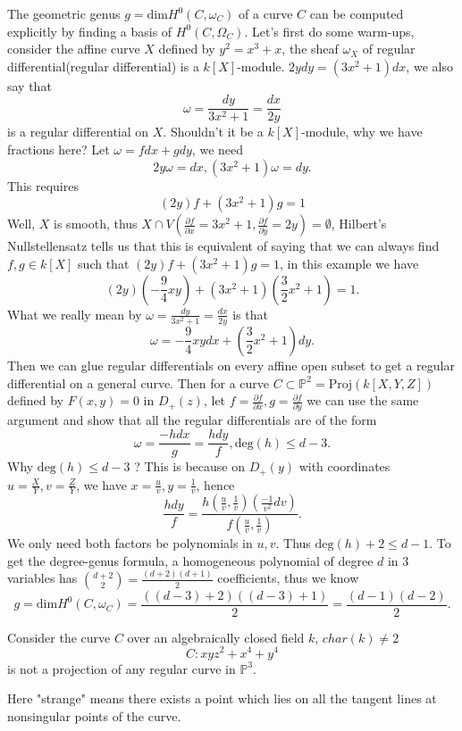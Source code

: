 \documentclass[../main.tex]{subfiles}
\begin{document}
\begin{example}
The geometric genus $g=\mathrm{dim}H^{0}(C,\omega_{C})$ of a curve $C$ can be computed explicitly by finding a basis of $H^{0}(C, \Omega_{C}).$ Let's first do some warm-ups, consider the affine curve $X$ defined by $y^{2}=x^{3}+x$,  the sheaf $\omega_{X}$ of regular differential(regular differential) is a $k[X]$-module. $2ydy=(3x^{2}+1)dx$, we also say that $$\omega=\frac{dy}{3x^{2}+1}=\frac{dx}{2y}$$
is a regular differential on $X$. Shouldn't it be a $k[X]$-module, why we have fractions here? Let $\omega=fdx+gdy$, we need 
$$2y\omega=dx, (3x^{2}+1)\omega=dy.$$
This requires 
$$(2y)f+(3x^{2}+1)g=1$$
Well, $X$ is smooth, thus $X\cap V(\frac{\partial f}{\partial x}=3x^{2}+1,\frac{\partial f}{\partial y}=2y)=\emptyset$, Hilbert's Nullstellensatz tells us that this is equivalent of saying that we can always find $f,g \in k[X]$ such that $(2y)f+(3x^{2}+1)g=1$, in this example we have 
$$(2y)(-\frac{9}{4}xy)+(3x^{2}+1)(\frac{3}{2}x^{2}+1)=1.$$
What we really mean by $\omega=\frac{dy}{3x^{2}+1}=\frac{dx}{2y}$ is that 
$$\omega=-\frac{9}{4}xydx+(\frac{3}{2}x^{2}+1)dy.$$
Then we can glue regular differentials on every affine open subset to get a regular differential on a general curve. Then for a curve $C\subset \mathbb{P}^{2}=\mathrm{Proj}(k[X,Y,Z])$ defined by $F(x,y)=0$ in $D_{+}(z)$, let $f=\frac{\partial f}{\partial x}, g=\frac{\partial f}{\partial y}$ we can use the same argument and show that all the regular differentials are of the form 
$$\omega=\frac{-hdx}{g}=\frac{hdy}{f} , \mathrm{deg}(h)\leq d-3.$$
Why $\mathrm{deg}(h)\leq d-3$ ? This is because on $D_{+}(y)$ with coordinates $u=\frac{X}{Y}, v=\frac{Z}{Y}$, we have $x=\frac{u}{v}, y=\frac{1}{v}$, hence $$\frac{hdy}{f}=\frac{h(\frac{u}{v}, \frac{1}{v})(\frac{-1}{v^{2}}dv)}{f(\frac{u}{v}, \frac{1}{v})}.$$
We only need both factors be polynomials in $u,v$. Thus $\mathrm{deg}(h)+2\leq d-1.$
To get the degree-genus formula, a homogeneous polynomial of degree $d$ in $3$ variables has $\binom{d+2}{2}=\frac{(d+2)(d+1)}{2}$ coefficients, thus we know 
$$g=\mathrm{dim}H^{0}(C,\omega_{C})=\frac{((d-3)+2)((d-3)+1)}{2}=\frac{(d-1)(d-2)}{2}.$$
\end{example}







\begin{example}
Consider the curve $C$ over an algebraically closed field $k$, $char(k)\neq 2$
$$C: xyz^{2}+x^{4}+y^{4}$$
is not a projection of any regular curve in $\mathbb{P}^{3}$.
\end{example}
\begin{example}
Here "strange" means there exists a point which lies on all the tangent lines at nonsingular points of the curve.
\end{example}
\end{document}
